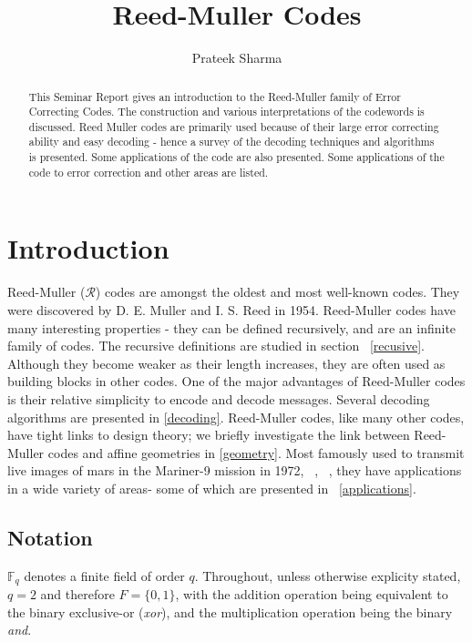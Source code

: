 \documentclass{article}
\title{Reed-Muller Codes}
\author{Prateek Sharma}
\newcommand{\F}{\ensuremath{\mathbb{F}}}
\theoremstyle{plain}
\begin{document}


\maketitle

\begin{abstract} 
This Seminar Report gives an introduction to the Reed-Muller family of Error Correcting Codes. The construction and various interpretations of the codewords is discussed. Reed Muller codes are primarily used because of their large error correcting ability and easy decoding - hence a survey of the decoding techniques and algorithms is presented. Some applications of the code are also presented. Some applications of the code to error correction and other areas are listed.
\end{abstract}


\section {Introduction}


Reed-Muller ($\mathcal{R}$) codes are amongst the oldest and most well-known codes. They were discovered by D. E. Muller and I. S. Reed in 1954. \cite{reed} \cite{muller}
Reed-Muller codes have many interesting properties - they can be defined recursively, and are an infinite family of codes. The recursive definitions are studied in section ~\ref{recusive}.
Although they become weaker as their length increases, they are often used as building blocks in other codes. One of the major advantages of Reed-Muller codes is their relative simplicity to encode and decode messages. Several decoding algorithms are presented in \ref{decoding}.  Reed-Muller codes, like many other codes, have tight links to design theory; we briefly investigate the link between Reed-Muller codes and affine geometries in \ref{geometry}.
Most famously used to transmit live images of mars in the Mariner-9 mission in 1972, ~\cite{space},~\cite{sloane} , they have applications in a wide variety of areas- some of which are presented in ~\ref{applications}.


\subsection {Notation}
\label{notation}


$\F{} _q$ denotes a finite field of order $q$.
Throughout, unless otherwise explicity stated, $q=2$ and therefore $F=\{0,1\}$, with the addition operation being equivalent to the binary exclusive-or (\emph{xor}), and the multiplication operation being the binary \emph{and}.
\end{document}
